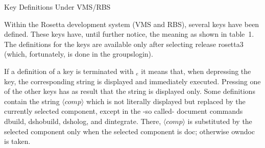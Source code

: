 
   \RosDate{\today}
   \RosSupersedes{-}
   \MakeRosTitle
%
%
\setlength{\parindent}{0in}
{\Large Key Definitions Under VMS/RBS}\vspace{2mm}

Within the Rosetta development system (VMS and RBS), several keys have been 
defined. These keys have, until further notice, the meaning as shown in table~1.
The definitions for the keys are available only after selecting release 
rosetta3 (which, fortunately, is done in the groupslogin).\vspace{2mm}

If a definition of a key is terminated with $_e$ it means that, when depressing 
the key, the corresponding string is displayed and immediately executed. 
Pressing one of the other keys has as result that the string is displayed only. 
Some definitions contain the string $\langle comp\rangle$ which is not 
literally displayed but replaced by the currently selected component, except in 
the -so called- document commands dbuild, dshobuild, dsholog, and dintegrate. 
There, $\langle comp\rangle$ is substituted by the selected component only when 
the selected component is doc; otherwise owndoc is taken.\vspace{2mm}

